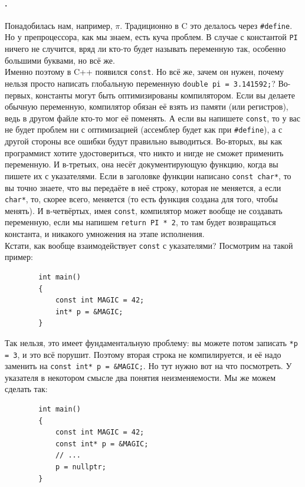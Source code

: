 \documentclass{article}
\begin{document}
    \paragraph{.}
    Понадобилась нам, например, $\pi$. Традиционно в C это делалось через \texttt{#define}. Но у препроцессора, как мы знаем, есть куча проблем. В случае с константой \texttt{PI} ничего не случится, вряд ли кто-то будет называть переменную так, особенно большими буквами, но всё же.\\
    Именно поэтому в C++ появился \texttt{const}. Но всё же, зачем он нужен, почему нельзя просто написать глобальную переменную \texttt{double pi = 3.141592;}? Во-первых, константы могут быть оптимизированы компилятором. Если вы делаете обычную переменную, компилятор обязан её взять из памяти (или регистров), ведь в другом файле кто-то мог её поменять. А если вы напишете \texttt{const}, то у вас не будет проблем ни с оптимизацией (ассемблер будет как при \texttt{#define}), а с другой стороны все ошибки будут правильно выводиться. Во-вторых, вы как программист хотите удостовериться, что никто и нигде не сможет применить переменную. И в-третьих, она несёт документирующую функцию, когда вы пишете их с указателями. Если в заголовке функции написано \texttt{const char*}, то вы точно знаете, что вы передаёте в неё строку, которая не меняется, а если \texttt{char*}, то, скорее всего, меняется (то есть функция создана для того, чтобы менять). И в-четвёртых, имея \texttt{const}, компилятор может вообще не создавать переменную, если мы напишем \texttt{return PI * 2}, то там будет возвращаться константа, и никакого умножения на этапе исполнения.\\
    Кстати, как вообще взаимодействует \texttt{const} с указателями? Посмотрим на такой пример:
    \begin{verbatim}
        int main()
        {
            const int MAGIC = 42;
            int* p = &MAGIC;
        }
    \end{verbatim}
    Так нельзя, это имеет фундаментальную проблему: вы можете потом записать \texttt{*p = 3}, и это всё порушит. Поэтому вторая строка не компилируется, и её надо заменить на \texttt{const int* p = &MAGIC;}. Но тут нужно вот на что посмотреть. У указателя в некотором смысле два понятия неизменяемости. Мы же можем сделать так:
    \begin{verbatim}
        int main()
        {
            const int MAGIC = 42;
            const int* p = &MAGIC;
            // ...
            p = nullptr;
        }
    \end{verbatim}
\end{document}
